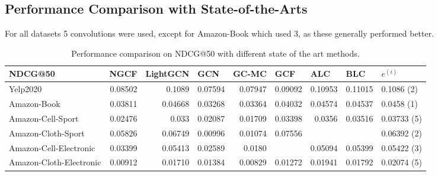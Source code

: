 \subsection{Performance Comparison with State-of-the-Arts}
For all datasets 5 convolutions were used, except for Amazon-Book which used 3, as these generally performed better.


\begin{table*}[] %
    \centering  %
    \begin{tabular}{|l|r|r|r|r|r||r|r|l|}
        \hline
        NDCG@50                 & \multicolumn{1}{l|}{NGCF} & \multicolumn{1}{l|}{LightGCN} & \multicolumn{1}{l|}{GCN} & \multicolumn{1}{l|}{GC-MC} & \multicolumn{1}{l||}{GCF} & \multicolumn{1}{l|}{ALC} & \multicolumn{1}{l|}{BLC} & $e^{(i)}$   \\ \hline
        Yelp2020                & 0.08502                   & 0.1089                        & 0.07594                  & 0.07947                    & 0.09092                   & 0.10953                  & 0.11015                  & 0.1086 (2)  \\ \hline
        Amazon-Book             & 0.03811                   & 0.04668                       & 0.03268                  & 0.03364                    & 0.04032                   & 0.04574                  & 0.04537                  & 0.0458 (1)  \\ \hline
        Amazon-Cell-Sport       & 0.02476                   & 0.033                         & 0.02087                  & 0.01709                    & 0.03398                   & 0.0356                   & 0.03516                  & 0.03733 (5) \\ \hline
        Amazon-Cloth-Sport      & 0.05826                   & 0.06749                       & 0.00996                  & 0.01074                    & 0.07556                   &                          &                          & 0.06392 (2) \\ \hline
        Amazon-Cell-Electronic  & 0.03399                   & 0.05413                       & 0.02589                  & 0.0180                     &                           & 0.05094                  & 0.05399                  & 0.05422 (3) \\ \hline
        Amazon-Cloth-Electronic & 0.00912                   & 0.01710                       & 0.01384                  & 0.00829                    & 0.01272                   & 0.01941                  & 0.01792                  & 0.02074 (5) \\ \hline
    \end{tabular}
    \caption{Performance comparison on NDCG@50 with different state of the art methods.}
    \label{tab:baselines-ndcg}
\end{table*}

